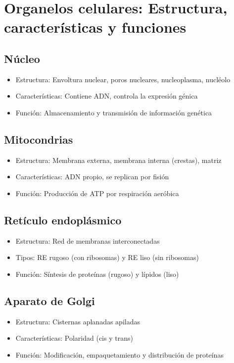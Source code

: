 \section{Organelos celulares: Estructura, características y funciones}

\subsection{Núcleo}
\begin{itemize}
    \item Estructura: Envoltura nuclear, poros nucleares, nucleoplasma, nucléolo
    \item Características: Contiene ADN, controla la expresión génica
    \item Función: Almacenamiento y transmisión de información genética
\end{itemize}

\subsection{Mitocondrias}
\begin{itemize}
    \item Estructura: Membrana externa, membrana interna (crestas), matriz
    \item Características: ADN propio, se replican por fisión
    \item Función: Producción de ATP por respiración aeróbica
\end{itemize}

\subsection{Retículo endoplásmico}
\begin{itemize}
    \item Estructura: Red de membranas interconectadas
    \item Tipos: RE rugoso (con ribosomas) y RE liso (sin ribosomas)
    \item Función: Síntesis de proteínas (rugoso) y lípidos (liso)
\end{itemize}

\subsection{Aparato de Golgi}
\begin{itemize}
    \item Estructura: Cisternas aplanadas apiladas
    \item Características: Polaridad (cis y trans)
    \item Función: Modificación, empaquetamiento y distribución de proteínas
\end{itemize}

